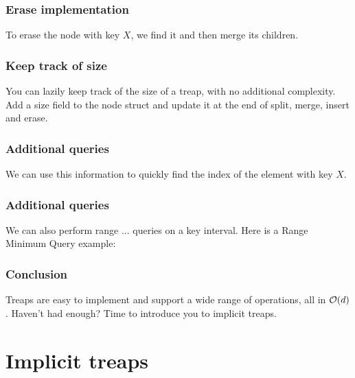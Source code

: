 \begin{frame}
	\frametitle{Erase implementation}

	To erase the node with key $X$, we find it and then merge its children.

	\begin{center}
		
	\end{center}
\end{frame}

\begin{frame}
	\frametitle{Keep track of size}

	You can lazily keep track of the size of a treap, with no additional complexity. Add a size field to the node struct and update it at the end of split, merge, insert and erase.

	\begin{center}
		
	\end{center}
\end{frame}

\begin{frame}
	\frametitle{Additional queries}

	We can use this information to quickly find the index of the element with key $X$.

	\begin{center}
		
	\end{center}
\end{frame}

\begin{frame}
	\frametitle{Additional queries}

	We can also perform range ... queries on a key interval. Here is a Range Minimum Query example:

	\begin{center}
		
	\end{center}
\end{frame}

\begin{frame}
	\frametitle{Conclusion}

	Treaps are easy to implement and support a wide range of operations, all in $\mathcal O(d)$. Haven't had enough? Time to introduce you to implicit treaps.
\end{frame}

\section{Implicit treaps}


